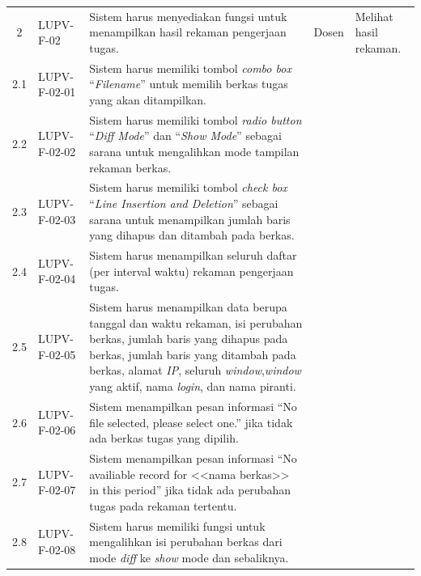 {\begin{longtable}{|c|L{2.5cm}|L{5cm}|L{1.8cm}|L{2.1cm}|}
    2 & LUPV-F-02 & Sistem harus menyediakan fungsi untuk menampilkan
                    hasil rekaman pengerjaan tugas. & Dosen & Melihat
                                                              hasil rekaman. \\
    2.1 & LUPV-F-02-01 & Sistem harus memiliki tombol \emph{combo box}
                         ``\emph{Filename}'' untuk memilih berkas tugas yang akan
                         ditampilkan. & & \\
    2.2 & LUPV-F-02-02 & Sistem harus memiliki tombol \emph{radio
                         button} ``\emph{Diff Mode}'' dan ``\emph{Show
                         Mode}'' sebagai sarana untuk
                         mengalihkan mode tampilan rekaman
                         berkas. & & \\
    2.3 & LUPV-F-02-03 & Sistem harus memiliki tombol \emph{check
                         box} ``\emph{Line Insertion and Deletion}''
                         sebagai sarana untuk menampilkan jumlah baris yang
                         dihapus dan ditambah pada berkas. & & \\
    2.4 & LUPV-F-02-04 & Sistem harus menampilkan seluruh daftar (per interval waktu)
                         rekaman pengerjaan tugas. & & \\
    2.5 & LUPV-F-02-05 & Sistem harus menampilkan data berupa tanggal dan waktu
                         rekaman, isi perubahan berkas, jumlah baris
                         yang dihapus pada berkas, jumlah baris yang
                         ditambah pada berkas, alamat \emph{IP},
                         seluruh \emph{window},\emph{window} yang
                         aktif, nama \emph{login}, dan nama
                         piranti. & & \\
    2.6 & LUPV-F-02-06 & Sistem menampilkan pesan informasi ``No file selected,
                         please select one.'' jika tidak
                         ada berkas tugas yang dipilih. & & \\
    2.7 & LUPV-F-02-07 & Sistem menampilkan pesan informasi ``No availiable
                         record for <<nama berkas>> in this period'' jika
                         tidak ada perubahan tugas pada rekaman
                         tertentu. & & \\
    2.8 & LUPV-F-02-08 & Sistem harus memiliki fungsi untuk
                         mengalihkan isi perubahan berkas dari mode
                         \emph{diff} ke \emph{show} mode dan sebaliknya. &

\end{longtable}}
